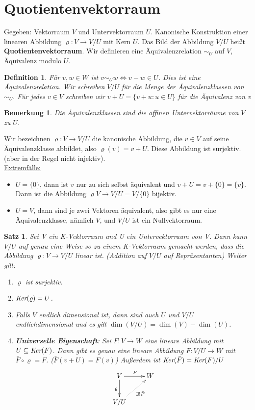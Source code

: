 \documentclass[12pt,a4paper]{article}
\theoremstyle{plain}
\newtheorem{Satz}[Theorem]{Satz}
\newtheorem{Definition}[Theorem]{Definition}
\newtheorem{Bemerkung}[Theorem]{Bemerkung}
\newcommand{\herv}[1]{{\emph{\textbf{#1}}}}
\numberwithin{equation}{section}
\begin{document}
\section{Quotientenvektorraum}
Gegeben: Vektorraum $V$ und Untervektorraum $U$. Kanonische Konstruktion einer linearen Abbildung $\varrho : V \rightarrow V/U$ mit Kern $U$. Das Bild der Abbildung $V/U$ heißt \textbf{Quotientenvektorraum}. Wir definieren eine Äquivalenzrelation $\sim_U$ auf $V$, \glqq Äquivalenz modulo $U$\grqq.
\begin{Definition}
Für $v,w\in W$ ist $v\sim_U w \Leftrightarrow v-w \in U$. Dies ist eine Äquivalenzrelation. Wir schreiben $V/U$ für die Menge der Äquivalenzklassen von $\sim_U.$ Für jedes $v\in V$ schreiben wir $v+U=\{v+u:u\in U\}$ für die Äquivalenz von v
\end{Definition}
\begin{Bemerkung}
Die Äquivalenzklassen sind die affinen Untervektorräume von $V$ zu $U$.
\end{Bemerkung}
Wir bezeichnen $\varrho:V\rightarrow V/U$ die kanonische Abbildung, die $v\in V$ auf seine Äquivalenzklasse abbildet, also $\varrho(v)=v+U$. Diese Abbildung ist surjektiv. (aber in der Regel nicht injektiv). \\
\underline{Extremfälle:} \begin{itemize}
\item $U=\{0\}$, dann ist $v$ nur zu sich selbst äquivalent und $v+U=v+\{0\}=\{v\}$. Dann ist die Abbildung $\varrho V\rightarrow V/U=V/\{0\}$ bijektiv.
\item $U=V$, dann sind je zwei Vektoren äquivalent, also gibt es nur eine Äquivalenzklasse, nämlich $V$, und $V/U$ ist ein Nullvektorraum.
\end{itemize}
\begin{Satz}
Sei V ein K-Vektorraum und U ein Untervektorraum von V. Dann kann $V/U$ auf genau eine Weise so zu einem K-Vektorraum gemacht werden, dass die Abbildung $\varrho:V\rightarrow V/U$ linear ist. (Addition auf $V/U$ auf Repräsentanten) Weiter gilt:
\begin{enumerate}
\renewcommand{\labelenumi}{\emph{\arabic{enumi})}}
\item $\varrho$ ist surjektiv.
\item $\emph{Ker}(\varrho)=U$.
\item Falls $V$ endlich dimensional ist, dann sind auch $U$ und $V/U$ endlichdimensional und es gilt $\dim(V/U)=\dim(V)-\dim(U)$.
\item \herv{Universelle Eigenschaft}: Sei $F:V\rightarrow W$ eine lineare Abbildung mit $U\subseteq \emph{Ker}(F)$. Dann gibt es genau eine lineare Abbildung $\bar{F}:V/U\rightarrow W$ mit $\bar{F}\circ \varrho=F$. ($\bar{F}(v+U)=F(v)$) Außerdem ist $\emph{Ker}(\bar{F})=\emph{Ker}(F)/U$
\[ \begin{xy}
	\xymatrix{
		V \ar[r]^F \ar[d]_\varrho & W \\
		V/U \ar@{.>}[ru]_{\exists ! \bar{F}}
	}
\end{xy} \]
\end{enumerate}
\end{Satz}
\end{document}
